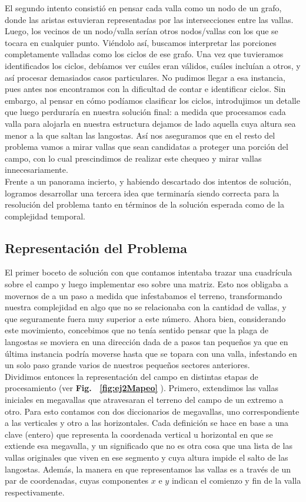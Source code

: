 \indent El segundo intento consistió en pensar cada valla como un nodo de un grafo, donde las aristas estuvieran representadas por las intersecciones entre las vallas. Luego, los vecinos de un nodo/valla serían otros nodos/vallas con los que se tocara en cualquier punto. Viéndolo así, buscamos interpretar las porciones completamente valladas como los ciclos de ese grafo. Una vez que tuvieramos identificados los ciclos, debíamos ver cuáles eran válidos, cuáles incluían a otros, y así procesar demasiados casos particulares. No pudimos llegar a esa instancia, pues antes nos encontramos con la dificultad de contar e identificar ciclos. Sin embargo, al pensar en cómo podíamos clasificar los ciclos, introdujimos un detalle que luego perduraría en nuestra solución final: a medida que procesamos cada valla para alojarla en nuestra estructura dejamos de lado aquella cuya altura sea menor a la que saltan las langostas. Así nos aseguramos que en el resto del problema vamos a mirar vallas que sean candidatas a proteger una porción del campo, con lo cual prescindimos de realizar este chequeo y mirar vallas innecesariamente.\\
\indent Frente a un panorama incierto, y habiendo descartado dos intentos de solución, logramos desarrollar una tercera idea que terminaría siendo correcta para la resolución del problema tanto en términos de la solución esperada como de la complejidad temporal. 

\subsection{Representación del Problema}

El primer boceto de solución con que contamos intentaba trazar una cuadrícula sobre el campo y luego implementar eso sobre una matriz. Esto nos obligaba a movernos de a un paso a medida que infestabamos el terreno, transformando nuestra complejidad en algo que no se relacionaba con la cantidad de vallas, y que seguramente fuera muy superior a este número. Ahora bien, considerando este movimiento, concebimos que no tenía sentido pensar que la plaga de langostas se moviera en una dirección dada de a pasos tan pequeños ya que en última instancia podría moverse hasta que se topara con una valla, infestando en un solo paso grande varios de nuestros pequeños sectores anteriores.\\
\indent Dividimos entonces la representación del campo en distintas etapas de procesamiento (ver \textbf{Fig. ~\ref{fig:ej2Mapeo} }). Primero, extendimos las vallas iniciales en megavallas que atravesaran el terreno del campo de un extremo a otro. Para esto contamos con dos diccionarios de megavallas, uno correspondiente a las verticales y otro a las horizontales. Cada definición se hace en base a una clave (entero) que representa la coordenada vertical u horizontal en que se extiende esa megavalla, y un significado que no es otra cosa que una lista de las vallas originales que viven en ese segmento y cuya altura impide el salto de las langostas. Además, la manera en que representamos las vallas es a través de un par de coordenadas, cuyas componentes $x$ e $y$ indican el comienzo y fin de la valla respectivamente.

